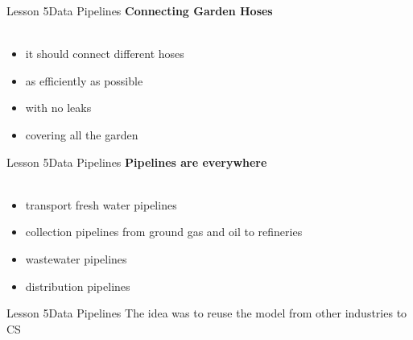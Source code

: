 \documentclass[aspectratio=1610]{beamer}
\begin{document}
\begin{frame}
\end{frame}


\begin{frame}
\end{frame}


\begin{frame}
\end{frame}

\begin{frame}{Lesson 5}{Data Pipelines}
\LARGE
\textbf{Connecting Garden Hoses}\\~\\
\begin{itemize}
    \item it should connect different hoses
    \item as efficiently as possible
    \item with no leaks
    \item covering all the garden
\end{itemize}
\end{frame}



\begin{frame}{Lesson 5}{Data Pipelines}
\LARGE
\textbf{Pipelines are everywhere}\\~\\
\begin{itemize}
    \item transport fresh water pipelines
    \item collection pipelines from ground gas and oil to refineries
    \item wastewater pipelines
    \item distribution pipelines
\end{itemize}
\end{frame}


\begin{frame}
\end{frame}



\begin{frame}{Lesson 5}{Data Pipelines}
\Huge
 The idea was to reuse the model from other industries to CS
 \end{frame}
\end{document}
